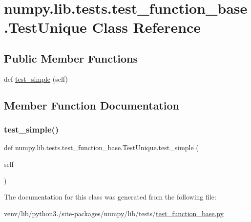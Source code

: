 \hypertarget{classnumpy_1_1lib_1_1tests_1_1test__function__base_1_1TestUnique}{}\section{numpy.\+lib.\+tests.\+test\+\_\+function\+\_\+base.\+Test\+Unique Class Reference}
\label{classnumpy_1_1lib_1_1tests_1_1test__function__base_1_1TestUnique}
\subsection*{Public Member Functions}
\begin{DoxyCompactItemize}
\item 
def \hyperlink{classnumpy_1_1lib_1_1tests_1_1test__function__base_1_1TestUnique_acb07f5a906dc5215c6c0a62a3e464b64}{test\+\_\+simple} (self)
\end{DoxyCompactItemize}


\subsection{Member Function Documentation}
\mbox{\label{classnumpy_1_1lib_1_1tests_1_1test__function__base_1_1TestUnique_acb07f5a906dc5215c6c0a62a3e464b64}} 
\subsubsection{\texorpdfstring{test\+\_\+simple()}{test\_simple()}}
{\footnotesize\ttfamily def numpy.\+lib.\+tests.\+test\+\_\+function\+\_\+base.\+Test\+Unique.\+test\+\_\+simple (\begin{DoxyParamCaption}\item[{}]{self }\end{DoxyParamCaption})}



The documentation for this class was generated from the following file\+:\begin{DoxyCompactItemize}
\item 
venv/lib/python3./site-\/packages/numpy/lib/tests/\hyperlink{lib_2tests_2test__function__base_8py}{test\+\_\+function\+\_\+base.\+py}\end{DoxyCompactItemize}
